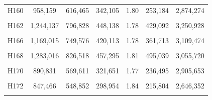 \documentclass[
  a4paper,
  titlepage]{article}
\begin{document}
\begin{longtable}[t]{ccccccc}
H160 & 958,159 & 616,465 & 342,105 & 1.80 & 253,184 & 2,874,274\\
 
\cellcolor{gray!6}{H161} & \cellcolor{gray!6}{1,126,010} & \cellcolor{gray!6}{717,362} & \cellcolor{gray!6}{409,199} & \cellcolor{gray!6}{1.75} & \cellcolor{gray!6}{343,161} & \cellcolor{gray!6}{3,065,642}\\
 
H162 & 1,244,137 & 796,828 & 448,138 & 1.78 & 429,092 & 3,250,928\\
 
\cellcolor{gray!6}{H164} & \cellcolor{gray!6}{1,576,207} & \cellcolor{gray!6}{1,011,742} & \cellcolor{gray!6}{565,596} & \cellcolor{gray!6}{1.79} & \cellcolor{gray!6}{594,579} & \cellcolor{gray!6}{3,200,078}\\
 
H166 & 1,169,015 & 749,576 & 420,113 & 1.78 & 361,713 & 3,109,474\\
 
\cellcolor{gray!6}{H167} & \cellcolor{gray!6}{1,023,700} & \cellcolor{gray!6}{657,969} & \cellcolor{gray!6}{366,177} & \cellcolor{gray!6}{1.80} & \cellcolor{gray!6}{275,667} & \cellcolor{gray!6}{2,732,167}\\
 
H168 & 1,283,016 & 826,518 & 457,295 & 1.81 & 495,039 & 3,055,720\\
 
\cellcolor{gray!6}{H169} & \cellcolor{gray!6}{1,118,635} & \cellcolor{gray!6}{717,944} & \cellcolor{gray!6}{401,212} & \cellcolor{gray!6}{1.79} & \cellcolor{gray!6}{323,234} & \cellcolor{gray!6}{3,048,966}\\
 
H170 & 890,831 & 569,611 & 321,651 & 1.77 & 236,495 & 2,905,653\\
 
\cellcolor{gray!6}{H171} & \cellcolor{gray!6}{1,386,263} & \cellcolor{gray!6}{892,740} & \cellcolor{gray!6}{494,616} & \cellcolor{gray!6}{1.80} & \cellcolor{gray!6}{546,125} & \cellcolor{gray!6}{3,180,814}\\
 
H172 & 847,466 & 548,852 & 298,954 & 1.84 & 215,804 & 2,646,352\\
 
\cellcolor{gray!6}{H173} & \cellcolor{gray!6}{1,001,126} & \cellcolor{gray!6}{642,214} & \cellcolor{gray!6}{359,402} & \cellcolor{gray!6}{1.79} & \cellcolor{gray!6}{318,625} & \cellcolor{gray!6}{2,763,557}\\
 

\end{longtable}
\end{document}
